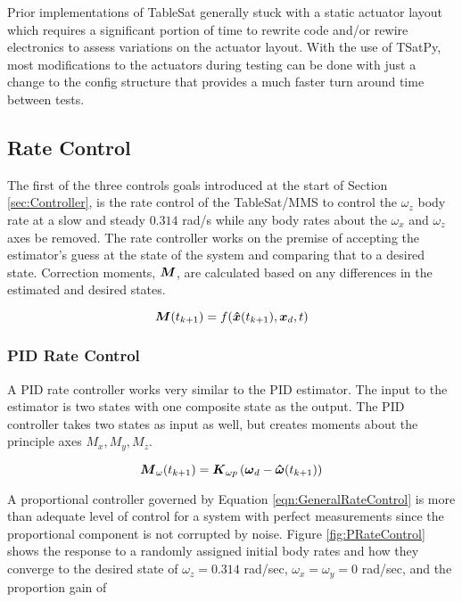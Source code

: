 Prior implementations of TableSat generally stuck with a static actuator layout which requires a significant portion of time to rewrite code and/or rewire electronics to assess variations on the actuator layout.  With the use of TSatPy, most modifications to the actuators during testing can be done with just a change to the config structure that provides a much faster turn around time between tests.

\subsection{Rate Control}
\label{subsec:RateControl}

The first of the three controls goals introduced at the start of Section \ref{sec:Controller}, is the rate control of the TableSat/MMS to control the $\omega_z$ body rate at a slow and steady $0.314$ rad/s while any body rates about the $\omega_x$ and $\omega_z$ axes be removed.  The rate controller works on the premise of accepting the estimator's guess at the state of the system and comparing that to a desired state.  Correction moments, $\boldsymbol{M}$, are calculated based on any differences in the estimated and desired states.

\begin{equation}
  \boldsymbol{M}(t_{k+1}) = f(\boldsymbol{\hat{x}}(t_{k+1}), \boldsymbol{x}_d, t)
  \label{eqn:GeneralRateControl}
\end{equation}

\subsubsection{PID Rate Control}
\label{subsubsec:PIDRateControl}

A PID rate controller works very similar to the PID estimator.  The input to the estimator is two states with one composite state as the output.  The PID controller takes two states as input as well, but creates moments about the principle axes $M_x, M_y, M_z$.

\begin{equation}
  \boldsymbol{M}_{\omega}(t_{k+1}) = \boldsymbol{K}_{\omega p} \left( \boldsymbol{\omega}_d - \boldsymbol{\hat{\omega}}(t_{k+1}) \right)
  \label{eqn:PIDRateControl}
\end{equation}

A proportional controller governed by Equation \ref{eqn:GeneralRateControl} is more than adequate level of control for a system with perfect measurements since the proportional component is not corrupted by noise.  Figure \ref{fig:PRateControl} shows the response to a randomly assigned initial body rates and how they converge to the desired state of $\omega_z = 0.314$ rad/sec, $\omega_x = \omega_y = 0$ rad/sec, and the proportion gain of

